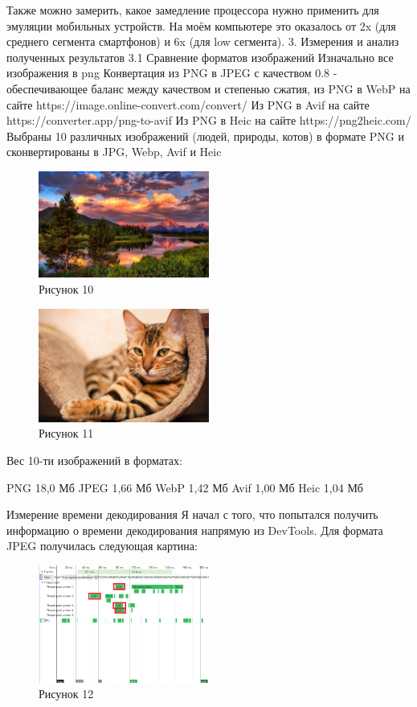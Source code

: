 \documentclass[12pt]{article}
\begin{document}
    Также можно замерить, какое замедление процессора нужно применить для эмуляции мобильных устройств. На моём компьютере это оказалось от 2x (для среднего сегмента смартфонов) и 6x (для low сегмента).
    3. Измерения и анализ полученных результатов
    3.1 Сравнение форматов изображений
    Изначально все изображения в png
    Конвертация из PNG в JPEG с качеством 0.8 - обеспечивающее баланс между качеством и степенью сжатия, из PNG в WebP на сайте https://image.online-convert.com/convert/
    Из PNG в Avif на сайте https://converter.app/png-to-avif
    Из PNG в Heic на сайте https://png2heic.com/
    Выбраны 10 различных изображений (людей, природы, котов) в формате PNG и сконвертированы в JPG, Webp, Avif и Heic
    \begin{figure}[h!]
        \centering
        \includegraphics[width=0.5\textwidth]{../images/image_comp/image1.png}
        \caption{Рисунок 10}
    \end{figure}

    \begin{figure}[h!]
        \centering
        \includegraphics[width=0.5\textwidth]{../images/image_comp/image4.png}
        \caption{Рисунок 11}
    \end{figure}

    Вес 10-ти изображений в форматах:

    PNG 18,0 Мб
    JPEG 1,66 Мб
    WebP 1,42 Мб
    Avif 1,00 Мб
    Heic 1,04 Мб

    Измерение времени декодирования
    Я начал с того, что попытался получить информацию о времени декодирования напрямую из DevTools. Для формата JPEG получилась следующая картина:
    \begin{figure}[h!]
        \centering
        \includegraphics[width=0.5\textwidth]{../images/image_comp/devtools.png}
        \caption{Рисунок 12}
    \end{figure}
\end{document}
